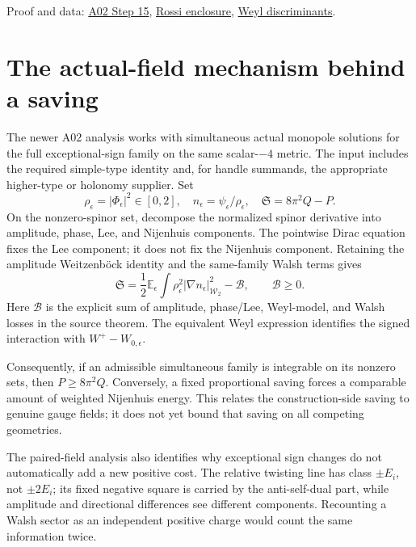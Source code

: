 \documentclass[
]{article}
\begin{document}
Proof and data:
\href{sources/Sessions/S1003A02/workspace/notes/step15_ach_projected_theory.md}{A02
Step 15},
\href{sources/Sessions/S1003A02/workspace/data/ach_capd/rossi_enclosure_b0.8.json}{Rossi
enclosure},
\href{sources/Sessions/S1003A02/workspace/data/ach_capd/weyl_discriminant_t0.5.json}{Weyl
discriminants}.

\hypertarget{the-actual-field-mechanism-behind-a-saving}{%
\section{The actual-field mechanism behind a
saving}\label{the-actual-field-mechanism-behind-a-saving}}

The newer A02 analysis works with simultaneous actual monopole solutions
for the full exceptional-sign family on the same scalar-\(-4\) metric.
The input includes the required simple-type identity and, for handle
summands, the appropriate higher-type or holonomy supplier. Set \[
 \rho_\epsilon=|\Phi_\epsilon|^2\in[0,2],\quad
 n_\epsilon=\psi_\epsilon/\rho_\epsilon,\quad
 \mathfrak S=8\pi^2Q-P.
\] On the nonzero-spinor set, decompose the normalized spinor derivative
into amplitude, phase, Lee, and Nijenhuis components. The pointwise
Dirac equation fixes the Lee component; it does not fix the Nijenhuis
component. Retaining the amplitude Weitzenböck identity and the
same-family Walsh terms gives \[
 \mathfrak S=
 \frac12\mathbb E_\epsilon\int\rho_\epsilon^2
 |\nabla n_\epsilon|_{\mathcal W_2}^2-\mathcal B,
 \qquad \mathcal B\ge0.
\] Here \(\mathcal B\) is the explicit sum of amplitude, phase/Lee,
Weyl-model, and Walsh losses in the source theorem. The equivalent Weyl
expression identifies the signed interaction with
\(W^+-W_{0,\epsilon}\).

Consequently, if an admissible simultaneous family is integrable on its
nonzero sets, then \(P\ge8\pi^2Q\). Conversely, a fixed proportional
saving forces a comparable amount of weighted Nijenhuis energy. This
relates the construction-side saving to genuine gauge fields; it does
not yet bound that saving on all competing geometries.

The paired-field analysis also identifies why exceptional sign changes
do not automatically add a new positive cost. The relative twisting line
has class \(\pm E_i\), not \(\pm2E_i\); its fixed negative square is
carried by the anti-self-dual part, while amplitude and directional
differences see different components. Recounting a Walsh sector as an
independent positive charge would count the same information twice.
\end{document}
